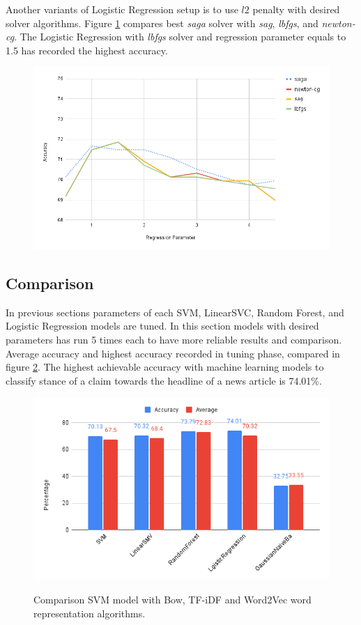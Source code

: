 Another variants of Logistic Regression setup is to use $l2$ penalty with desired solver algorithms. Figure \ref{fig:logistic3} compares best \textit{saga} solver with \textit{sag}, \textit{lbfgs}, and \textit{newton-cg}. The Logistic Regression with \textit{lbfgs} solver and regression parameter equals to 1.5 has recorded the highest accuracy. 
\begin{figure}%
	\centering
	{\includegraphics[width=12.5cm]{statistics/logistic1.png} }
	\caption{}%
	\label{fig:logistic3}%
\end{figure}

\subsection{Comparison}
In previous sections parameters of each SVM, LinearSVC, Random Forest, and Logistic Regression models are tuned. In this section models with desired parameters has run 5 times each to have more reliable results and comparison. Average accuracy and highest accuracy recorded in tuning phase, compared in figure \ref{fig:all}. The highest achievable accuracy with machine learning models to classify stance of a claim towards the headline of a news article is 74.01\%.
\begin{figure}%
	\centering
	{\includegraphics[width=12.5cm]{statistics/machinlearning.png} }
	\caption{Comparison SVM model with Bow, TF-iDF and Word2Vec word representation algorithms.}%
	\label{fig:all}%
\end{figure}
